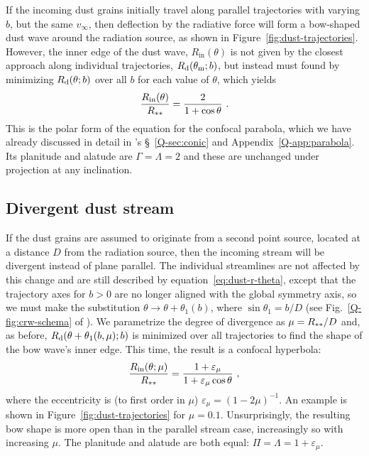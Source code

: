 If the incoming dust grains initially travel along parallel
trajectories with varying \(b\), but the same \(v_\infty\), then deflection
by the radiative force will form a bow-shaped dust wave around the
radiation source, as shown in Figure~\ref{fig:dust-trajectories}.
However, the inner edge of the dust wave, \(R_{\text{in}}(\theta)\) is not
given by the closest approach along individual trajectories,
\(R_{\text{d}}(\theta_{\text{m}}; b)\), but instead must found by minimizing
\(R_{\text{d}}(\theta; b)\) over all \(b\) for each value of \(\theta\), which yields
\begin{equation}
  \label{eq:dust-r-in}
  \frac{R_{\text{in}}(\theta)} {R\starstar} = \frac{2}{1 + \cos\theta} \ .
\end{equation}
This is the polar form of the equation for the confocal parabola,
which we have already discussed in detail in \PaperI{}'s
\S~\ref{Q-sec:conic} and Appendix~\ref{Q-app:parabola}.  Its planitude
and alatude are \(\Gamma = \Lambda = 2\) and these are unchanged under projection
at any inclination.



\subsection{Divergent dust stream}
\label{sec:dust-divergent}

If the dust grains are assumed to originate from a second point
source, located at a distance \(D\) from the radiation source, then
the incoming stream will be divergent instead of plane parallel.  The
individual streamlines are not affected by this change and are still
described by equation~\eqref{eq:dust-r-theta}, except that the
trajectory axes for \(b > 0\) are no longer aligned with the global
symmetry axis, so we must make the substitution
\(\theta \to \theta + \theta_1(b)\), where \(\sin \theta_1 = b / D\) (see
Fig.~\ref{Q-fig:crw-schema} of \PaperI{}). We parametrize the degree
of divergence as \(\mu = R_{**} / D\) and, as before,
\(R_{\text{d}}(\theta + \theta_1(b, \mu); b)\) is minimized over all trajectories to
find the shape of the bow wave's inner edge.  This time, the result is
a confocal hyperbola:
\begin{equation}
  \label{eq:dust-divergent-r-in}
  \frac{R_{\text{in}}(\theta; \mu)} {R_{**}} = \frac{1 + \varepsilon_\mu}{1 + \varepsilon_\mu\cos\theta} \ ,
\end{equation}
where the eccentricity is (to first order in \(\mu\))
\( \varepsilon_\mu = (1 - 2\mu)^{-1}\).  An example is shown in
Figure~\ref{fig:dust-trajectories} for \(\mu = 0.1\).  Unsurprisingly,
the resulting bow shape is more open than in the parallel stream case,
increasingly so with increasing \(\mu\).  The planitude and alatude are
both equal: \(\Pi = \Lambda = 1 + \varepsilon_\mu\).

